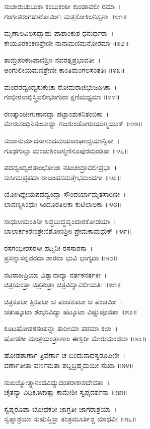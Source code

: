 ಸುಚಾರುಚುಬುಕಾ ಕಂಬುಕಂಠೀ ಕುಂಡಾವಲೀ ರಮಾ~।\\
ಗಂಗಾತರಂಗಹಾರೋರ್ಮಿಃ ಮತ್ತಕೋಕಿಲನಿಸ್ವನಾ ॥೪೧॥

	ಮೃಣಾಲವಿಲಸದ್ಬಾಹು ಪಾಶಾಂಕುಶ ಧನುರ್ಧರಾ~।\\
	ಕೇಯೂರಕಂಕಣಶ್ರೇಣೀ ನಾನಾಮಣಿಮನೋರಮಾ ॥೪೨॥

ತಾಮ್ರಪಂಕಜಪಾಣಿಶ್ರೀಃ ನವರತ್ನಪ್ರಭಾವತೀ~।\\
ಅಂಗುಲೀಯಮಣಿಶ್ರೇಣೀ ಕಾಂತಿಮಂಗಲಸಂತತಿಃ ॥೪೩॥

	ಮಂದರದ್ವಂದ್ವಸುಕುಚಾ ರೋಮರಾಜಿಭುಜಂಗಿಕಾ~।\\
	ಗಂಭೀರನಾಭಿಸ್ತ್ರಿವಲೀಭಂಗುರಾ ಕ್ಷಣಿಮಧ್ಯಮಾ ॥೪೪॥

ರಣತ್ಕಾಂಚೀಗುಣಾನದ್ಧಾ ಪಟ್ಟಾಂಶುಕನಿತಂಬಿಕಾ~।\\
ಮೇರುಸಂಧಿನಿತಂಬಾಢ್ಯಾ ಗಜಶುಂಡೋರುಯುಗ್ಮಯುಕ್ ॥೪೫॥

	ಸುಜಾನುರ್ಮದನಾನಂದಮಯಜಂಘಾದ್ವಯಾನ್ವಿತಾ~।\\
	ಗೂಢಗುಲ್ಫಾ ಮಂಜುಶಿಂಜನ್ಮಣಿನೂಪುರಮಂಡಿತಾ ॥೪೬॥

ಪದದ್ವಂದ್ವಜಿತಾಂಭೋಜಾ ನಖಚಂದ್ರಾವಲೀಪ್ರಭಾ~।\\
ಸುಸೀಮಪ್ರಪದಾ ರಾಜಂಹಸಮತ್ತೇಭಮಂದಗಾ ॥೪೭॥

	ಯೋಗಿಧ್ಯೇಯಪದದ್ವಂದ್ವಾ ಸೌಂದರ್ಯಾಮೃತಸಾರಿಣೀ~।\\
	ಲಾವಣ್ಯಸಿಂಧುಃ ಸಿಂದೂರತಿಲಕಾ ಕುಟಿಲಾಲಕಾ ॥೪೮॥

ಸಾಧುಸೀಮಂತಿನೀ ಸಿದ್ಧಬುದ್ಧವೃಂದಾರಕೋದಯಾ~।\\
ಬಾಲಾರ್ಕಕಿರಣಶ್ರೇಣಿಶೋಣಶ್ರೀಃ ಪ್ರೇಮಕಾಮಧುಕ್ ॥೪೯॥

	ರಸಗಂಭೀರಸರಸೀ ಪದ್ಮಿನೀ ರಸಸಾರಸಾ~।\\
	ಪ್ರಸನ್ನಾಸನ್ನವರದಾ ಶಾರದಾ ಭುವಿ ಭಾಗ್ಯದಾ ॥೫೦॥

ನಟರಾಜಪ್ರಿಯಾ ವಿಶ್ವಾನಾದ್ಯಾ ನರ್ತಕನರ್ತಕೀ~।\\
ಚಿತ್ರಯಂತ್ರಾ ಚಿತ್ರತಂತ್ರಾ ಚಿತ್ರವಿದ್ಯಾವಲೀಯತಿಃ ॥೫೧॥

	ಚಿತ್ರಕೂಟಾ ತ್ರಿಕೂಟಾ ಚ ಪಂಚಕೂಟಾ ಚ ಪಂಚಮೀ~।\\
	ಚತುಷ್ಕೂಟಾ ಶಂಭುವಿದ್ಯಾ ಷಟ್ಕೂಟಾ ವಿಷ್ಣುಪೂಜಿತಾ ॥೫೨॥

ಕೂಟಷೋಡಶಸಂಪನ್ನಾ ತುರೀಯಾ ಪರಮಾ ಕಲಾ~।\\
ಷೋಡಶೀ ಮಂತ್ರಯಂತ್ರಾಣಾಂ ಈಶ್ವರೀ ಮೇರುಮಂಡಲಾ ॥೫೩॥

	ಷೋಡಶಾರ್ಣಾ ತ್ರಿವರ್ಣಾ ಚ ಬಿಂದುನಾದಸ್ವರೂಪಿಣೀ~।\\
	ವರ್ಣಾತೀತಾ ವರ್ಣಮತಾ ಶಬ್ದಬ್ರಹ್ಮಮಯೀ ಸುಖಾ ॥೫೪॥

ಸುಖಜ್ಯೋತ್ಸ್ನಾನಂದವಿದ್ಯುದಂತರಾಕಾಶದೇವತಾ~।\\
ಚೈತನ್ಯಾ ವಿಧಿಕೂಟಾತ್ಮಾ ಕಾಮೇಶೀ ಸ್ವಪ್ನದರ್ಶನಾ ॥೫೫॥

	ಸ್ವಪ್ನರೂಪಾ ಬೋಧಕರೀ ಜಾಗ್ರತೀ ಜಾಗರಾಶ್ರಯಾ~।\\
	ಸ್ವಪ್ನಾಶ್ರಯಾ ಸುಷುಪ್ತಿಸ್ಥಾ ತಂತ್ರಮೂರ್ತಿಶ್ಚ ಮಾಧವೀ ॥೫೬॥

